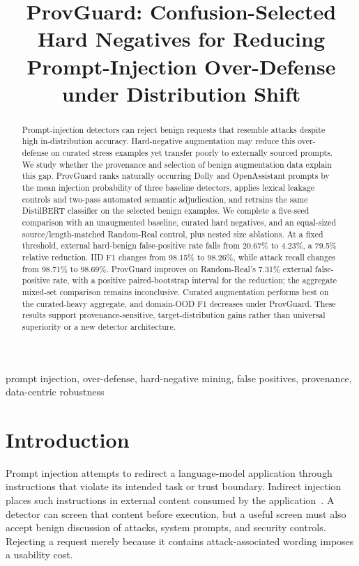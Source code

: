 \documentclass[conference]{IEEEtran}
\title{ProvGuard: Confusion-Selected Hard Negatives for Reducing Prompt-Injection Over-Defense under Distribution Shift}
\author{\IEEEauthorblockN{Anonymous Authors}}
\newcommand{\BaseIIDPct}{98.15}
\newcommand{\BaseRecPct}{98.71}
\newcommand{\BaseExtPct}{20.67}
\newcommand{\RandExtPct}{7.31}
\newcommand{\PGIIDPct}{98.26}
\newcommand{\PGRecPct}{98.69}
\newcommand{\PGExtPct}{4.23}
\newcommand{\BaseExtDropRel}{79.5}
\begin{document}
\maketitle

\begin{abstract}
Prompt-injection detectors can reject benign requests that resemble attacks despite high in-distribution accuracy. Hard-negative augmentation may reduce this over-defense on curated stress examples yet transfer poorly to externally sourced prompts. We study whether the provenance and selection of benign augmentation data explain this gap. ProvGuard ranks naturally occurring Dolly and OpenAssistant prompts by the mean injection probability of three baseline detectors, applies lexical leakage controls and two-pass automated semantic adjudication, and retrains the same DistilBERT classifier on the selected benign examples. We complete a five-seed comparison with an unaugmented baseline, curated hard negatives, and an equal-sized source/length-matched Random-Real control, plus nested size ablations. At a fixed threshold, external hard-benign false-positive rate falls from \BaseExtPct\% to \PGExtPct\%, a \BaseExtDropRel\% relative reduction. IID F1 changes from \BaseIIDPct\% to \PGIIDPct\%, while attack recall changes from \BaseRecPct\% to \PGRecPct\%. ProvGuard improves on Random-Real's \RandExtPct\% external false-positive rate, with a positive paired-bootstrap interval for the reduction; the aggregate mixed-set comparison remains inconclusive. Curated augmentation performs best on the curated-heavy aggregate, and domain-OOD F1 decreases under ProvGuard. These results support provenance-sensitive, target-distribution gains rather than universal superiority or a new detector architecture.
\end{abstract}
\begin{IEEEkeywords}
prompt injection, over-defense, hard-negative mining, false positives, provenance, data-centric robustness
\end{IEEEkeywords}

\section{Introduction}
Prompt injection attempts to redirect a language-model application through instructions that violate its intended task or trust boundary. Indirect injection places such instructions in external content consumed by the application~\cite{greshake}. A detector can screen that content before execution, but a useful screen must also accept benign discussion of attacks, system prompts, and security controls. Rejecting a request merely because it contains attack-associated wording imposes a usability cost.
\end{document}
